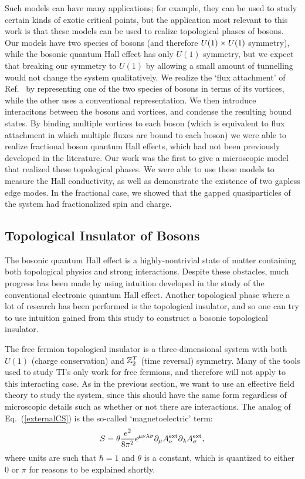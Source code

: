 Such models can have many applications; for example, they can be used to study certain kinds of exotic critical points, but the application most relevant to this work is that these models can be used to realize topological phases of bosons. 
Our models have two species of bosons (and therefore $U(1)\times U(1)$ symmetry), while the bosonic quantum Hall effect has only $U(1)$ symmetry, but we expect that breaking our symmetry to $U(1)$ by allowing a small amount of tunnelling would not change the system qualitatively.
We realize the `flux attachment' of Ref.~\cite{SenthilLevin2012} by representing one of the two species of bosons in terms of its vortices, while the other uses a conventional representation. We then introduce interacitons between the bosons and vortices, and condense the resulting bound states. 
By binding multiple vortices to each boson (which is equivalent to flux attachment in which multiple fluxes are bound to each boson) we were able to realize fractional boson quantum Hall effects, which had not been previously developed in the literature.  Our work was the first to give a microscopic model that realized these topological phases. We were able to use these models to measure the Hall conductivity, as well as demonstrate the existence of two gapless edge modes. In the fractional case, we showed that the gapped quasiparticles of the system had fractionalized spin and charge. 

\subsection{Topological Insulator of Bosons}

The bosonic quantum Hall effect is a highly-nontrivial state of matter containing both topological physics and strong interactions. Despite these obstacles, much progress has been made by using intuition developed in the study of the conventional electronic quantum Hall effect. Another topological phase where a lot of research has been performed is the topological insulator, and so one can try to use intuition gained from this study to construct a bosonic topological insulator.

The free fermion topological insulator is a three-dimensional system with both $U(1)$ (charge conservation) and $\mathbb{Z}_2^T$ (time reversal) symmetry. Many of the tools used to study TI's only work for free fermions, and therefore will not apply to this interacting case. As in the previous section, we want to use an effective field theory to study the system, since this should have the same form regardless of microscopic details such as whether or not there are interactions. The analog of Eq.~(\ref{externalCS}) is the so-called `magnetoelectric' term\cite{QHZ}:
\begin{equation}
S=\theta\frac{e^2}{8\pi^2} \epsilon^{\mu\nu\lambda\sigma} \partial_\mu A^{\rm ext}_\nu \partial_\lambda A^{\rm ext}_\sigma,
\label{externEB}
\end{equation}
where units are such that $\hbar=1$ and $\theta$ is a constant, which is quantized to either $0$ or $\pi$ for reasons to be explained shortly. 

